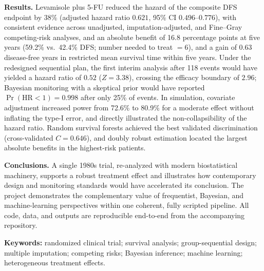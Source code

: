 \smallskip
\noindent\textbf{Results.} Levamisole plus 5-FU reduced the hazard of the
composite DFS endpoint by 38\% (adjusted hazard ratio $0.621$, 95\% CI
$0.496$--$0.776$), with consistent evidence across unadjusted,
imputation-adjusted, and Fine--Gray competing-risk analyses, and an absolute
benefit of 16.8 percentage points at five years (59.2\% vs.\ 42.4\% DFS;
number needed to treat $=6$), and a gain of 0.63 disease-free years in
restricted mean survival time within five years. Under the redesigned sequential plan, the
first interim analysis after 118 events would have yielded a hazard ratio of
$0.52$ ($Z=3.38$), crossing the efficacy boundary of $2.96$; Bayesian
monitoring with a skeptical prior would have reported
$\Pr(\mathrm{HR}<1)=0.998$ after only 25\% of events. In simulation,
covariate adjustment increased power from 72.6\% to 80.9\% for a moderate
effect without inflating the type-I error, and directly illustrated the
non-collapsibility of the hazard ratio. Random survival forests achieved
the best validated discrimination (cross-validated $C=0.646$), and doubly
robust estimation located the largest absolute benefits in the
highest-risk patients.

\smallskip
\noindent\textbf{Conclusions.} A single 1980s trial, re-analyzed with
modern biostatistical machinery, supports a robust treatment effect and
illustrates how contemporary design and monitoring standards would have
accelerated its conclusion. The project demonstrates the complementary value
of frequentist, Bayesian, and machine-learning perspectives within one
coherent, fully scripted pipeline. All code, data, and outputs are
reproducible end-to-end from the accompanying repository.

\smallskip
\noindent\textbf{Keywords:} randomized clinical trial; survival analysis;
group-sequential design; multiple imputation; competing risks; Bayesian
inference; machine learning; heterogeneous treatment effects.
